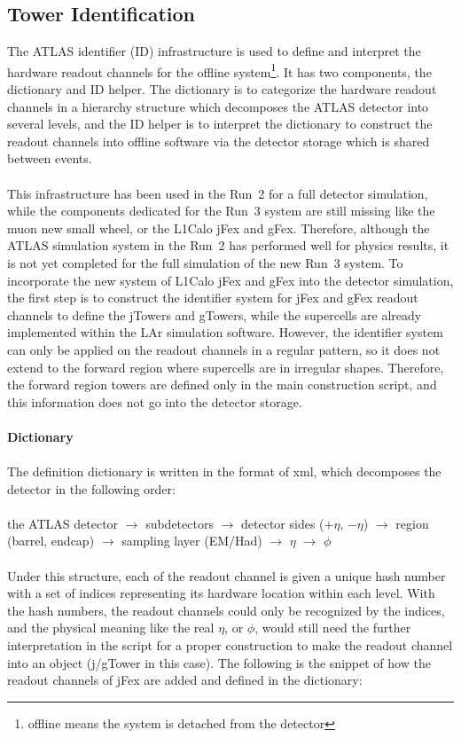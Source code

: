 \subsection{Tower Identification}
The ATLAS identifier (ID) infrastructure\cite{Schaffer:684167,Arnault:2003pa} is used to define and interpret the hardware readout channels for the offline system\footnote{offline means the system is detached from the detector}. It has two components, the dictionary and ID helper. The dictionary is to categorize the hardware readout channels in a hierarchy structure which decomposes the ATLAS detector into several levels, and the ID helper is to interpret the dictionary to construct the readout channels into offline software via the detector storage\cite{Calafiura:2003gf} which is shared between events. 
\\
\\This infrastructure has been used in the Run~2 for a full detector simulation, while the components dedicated for the Run~3 system are still missing like the muon new small wheel, or the L1Calo jFex and gFex. Therefore, although the ATLAS simulation system in the Run~2 has performed well for physics results, it is not yet completed for the full simulation of the new Run~3 system. To incorporate the new system of L1Calo jFex and gFex into the detector simulation, the first step is to construct the identifier system for jFex and gFex readout channels to define the jTowers and gTowers, while the supercells are already implemented within the LAr simulation software. However, the identifier system can only be applied on the readout channels in a regular pattern, so it does not extend to the forward region where supercells are in irregular shapes. Therefore, the forward region towers are defined only in the main construction script, and this information does not go into the detector storage\cite{Calafiura:2003gf}. 
\\
\\{\bf Dictionary}
\\
\\The definition dictionary is written in the format of xml, which decomposes the detector in the following order:
\\
\\the ATLAS detector $\to$ subdetectors $\to$ detector sides ($+\eta$, $-\eta$) $\to$ region (barrel, endcap) $\to$ sampling layer (EM/Had) $\to$ $\eta$ $\to$ $\phi$
\\
\\Under this structure, each of the readout channel is given a unique hash number with a set of indices representing its hardware location within each level. With the hash numbers, the readout channels could only be recognized by the indices, and the physical meaning like the real $\eta$, or $\phi$, would still need the further interpretation in the script for a proper construction to make the readout channel into an object (j/gTower in this case). The following is the snippet of how the readout channels of jFex are added and defined in the dictionary:
